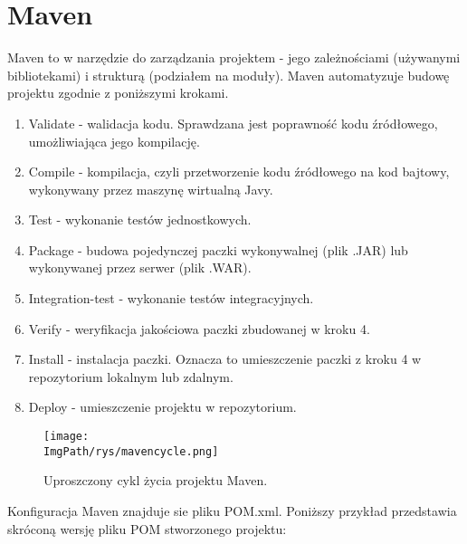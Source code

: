 \documentclass[a4paper,12pt,twoside,openany]{report}
\newcommand{\ImgPath}{.}
\begin{document}
\section{Maven}
Maven to w narzędzie do zarządzania projektem - jego zależnościami (używanymi bibliotekami) i strukturą (podziałem na moduły). Maven automatyzuje budowę projektu zgodnie z poniższymi krokami.
\begin{enumerate}
	\item Validate - walidacja kodu. Sprawdzana jest poprawność kodu źródłowego, umożliwiająca jego kompilację.
	\item Compile - kompilacja, czyli przetworzenie kodu źródłowego na kod bajtowy, wykonywany przez maszynę wirtualną Javy.
	\item Test - wykonanie testów jednostkowych.
	\item Package - budowa pojedynczej paczki wykonywalnej (plik .JAR) lub wykonywanej przez serwer (plik .WAR).
	\item Integration-test - wykonanie testów integracyjnych.
	\item Verify - weryfikacja jakościowa paczki zbudowanej w kroku 4.
	\item Install - instalacja paczki. Oznacza to umieszczenie paczki z kroku 4 w repozytorium lokalnym lub zdalnym.
	\item Deploy - umieszczenie projektu w repozytorium.
\end{enumerate}
				\begin{figure}[!htbp]
					\begin{center}
						\centering
						\texttt{[image: \\ImgPath/rys/mavencycle.png]}
					\end{center}
					\caption{Uproszczony cykl życia projektu Maven.}
					\label{UMLTS}
				\end{figure}
Konfiguracja Maven znajduje sie pliku POM.xml. Poniższy przykład przedstawia skróconą wersję pliku POM stworzonego projektu:
\end{document}
